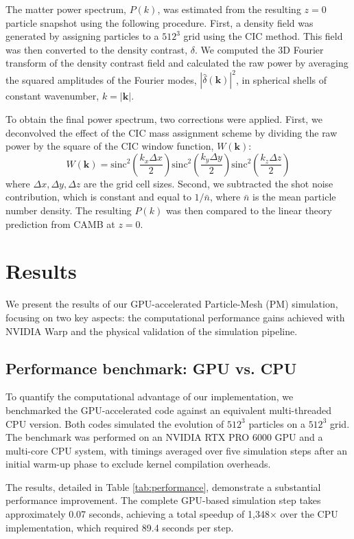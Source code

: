 \documentclass[]{article}
\begin{document}
The matter power spectrum, $P(k)$, was estimated from the resulting $z=0$ particle snapshot using the following procedure. First, a density field was generated by assigning particles to a $512^3$ grid using the CIC method. This field was then converted to the density contrast, $\delta$. We computed the 3D Fourier transform of the density contrast field and calculated the raw power by averaging the squared amplitudes of the Fourier modes, $|\hat{\delta}(\mathbf{k})|^2$, in spherical shells of constant wavenumber, $k = |\mathbf{k}|$.

To obtain the final power spectrum, two corrections were applied. First, we deconvolved the effect of the CIC mass assignment scheme by dividing the raw power by the square of the CIC window function, $W(\mathbf{k})$:
\begin{equation}
    W(\mathbf{k}) = \text{sinc}^2\left(\frac{k_x \Delta x}{2}\right) \text{sinc}^2\left(\frac{k_y \Delta y}{2}\right) \text{sinc}^2\left(\frac{k_z \Delta z}{2}\right)
\end{equation}
where $\Delta x, \Delta y, \Delta z$ are the grid cell sizes. Second, we subtracted the shot noise contribution, which is constant and equal to $1/\bar{n}$, where $\bar{n}$ is the mean particle number density. The resulting $P(k)$ was then compared to the linear theory prediction from CAMB at $z=0$.

\section{Results}
\label{sec:results}
We present the results of our GPU-accelerated Particle-Mesh (PM) simulation, focusing on two key aspects: the computational performance gains achieved with NVIDIA Warp and the physical validation of the simulation pipeline.

\subsection{Performance benchmark: GPU vs. CPU}
To quantify the computational advantage of our implementation, we benchmarked the GPU-accelerated code against an equivalent multi-threaded CPU version. Both codes simulated the evolution of $512^3$ particles on a $512^3$ grid. The benchmark was performed on an NVIDIA RTX PRO 6000 GPU and a multi-core CPU system, with timings averaged over five simulation steps after an initial warm-up phase to exclude kernel compilation overheads.

The results, detailed in Table \ref{tab:performance}, demonstrate a substantial performance improvement. The complete GPU-based simulation step takes approximately 0.07 seconds, achieving a total speedup of 1,348$\times$ over the CPU implementation, which required 89.4 seconds per step.
\end{document}
